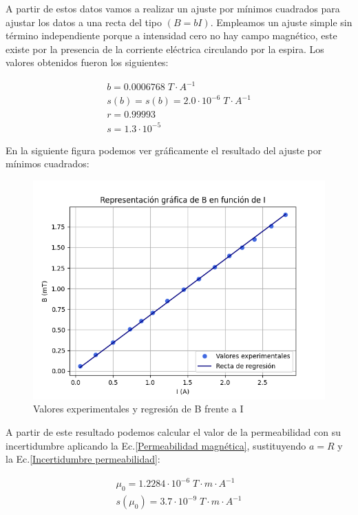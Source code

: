 \documentclass[a4paper,12pt,titlepage]{article}
\begin{document}
A partir de estos datos vamos a realizar un ajuste por mínimos cuadrados para ajustar los datos a una recta del tipo $(B=bI)$. Empleamos un ajuste simple sin término independiente porque a intensidad cero no hay campo magnético, este existe por la presencia de la corriente eléctrica circulando por la espira. Los valores obtenidos fueron los siguientes:

\begin{equation}
    \begin{gathered}
        b = 0.0006768 \; T\cdot A^{-1}\\
        s(b) = s(b) = 2.0 \cdot 10^{-6} \; T\cdot A^{-1} \\
        r = 0.99993 \\
        s = 1.3 \cdot 10^{-5}
    \end{gathered}
\end{equation}

En la siguiente figura podemos ver gráficamente el resultado del ajuste por mínimos cuadrados:

\begin{figure}
    \centering
    \includegraphics[width=0.85\linewidth]{Images/RegresionPermeabilidad.png}
    \caption{Valores experimentales y regresión de B frente a I}
\end{figure}

A partir de este resultado podemos calcular el valor de la permeabilidad con su incertidumbre aplicando la Ec.\ref{Permeabilidad magnética}, sustituyendo $a=R$ y la Ec.\ref{Incertidumbre permeabilidad}:

\begin{equation}
    \begin{gathered}
        \mu_0 = 1.2284 \cdot 10^{-6}\; T \cdot m \cdot A^{-1} \\
        s(\mu_0) = 3.7 \cdot 10^{-9}\; T \cdot m \cdot A^{-1}
    \end{gathered}
\end{equation}
\end{document}
